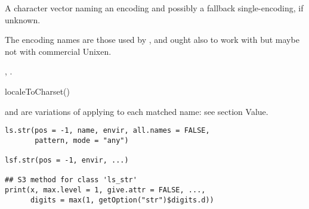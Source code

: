 %
\begin{Value}
A character vector naming an encoding and possibly a fallback
single-encoding,   if unknown.
\end{Value}
%
\begin{Note}\relax
The encoding names are those used by , and ought also
to work with  but maybe not with commercial Unixen.
\end{Note}
%
\begin{SeeAlso}\relax
{}, .
\end{SeeAlso}
%
\begin{Examples}
\begin{ExampleCode}
localeToCharset()
\end{ExampleCode}
\end{Examples}
%
\begin{Description}\relax
{} and  are variations of 
applying  to each matched name: see section Value.
\end{Description}
%
\begin{Usage}
\begin{verbatim}
ls.str(pos = -1, name, envir, all.names = FALSE,
       pattern, mode = "any")

lsf.str(pos = -1, envir, ...)

## S3 method for class 'ls_str'
print(x, max.level = 1, give.attr = FALSE, ...,
      digits = max(1, getOption("str")$digits.d))
\end{verbatim}
\end{Usage}
%
